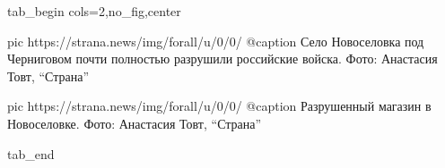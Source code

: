  
 
 
 
 


\ifcmt
  tab_begin cols=2,no_fig,center

     pic https://strana.news/img/forall/u/0/0/%
		 @caption Село Новоселовка под Черниговом почти полностью разрушили российские войска. Фото: Анастасия Товт, \enquote{Страна}

		 pic https://strana.news/img/forall/u/0/0/%
		 @caption Разрушенный магазин в Новоселовке. Фото: Анастасия Товт, \enquote{Страна}

  tab_end
\fi
